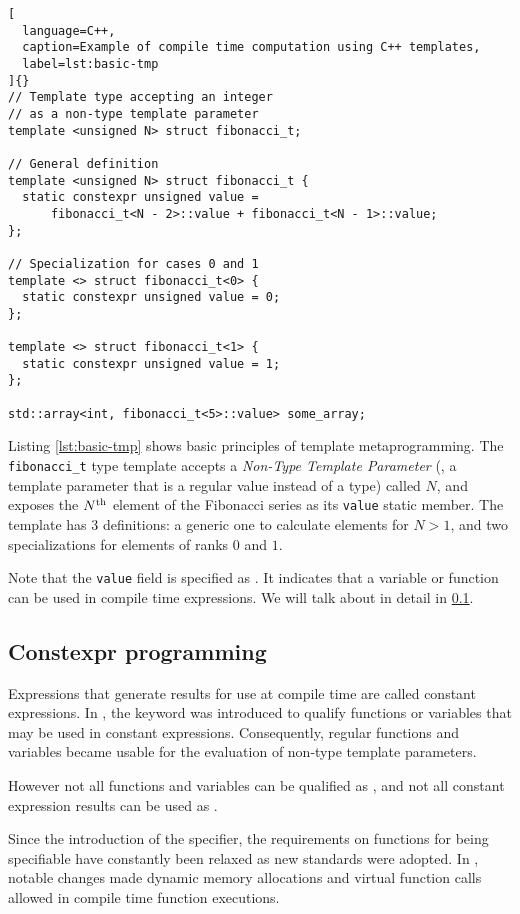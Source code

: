 \documentclass[../main]{subfiles}
\begin{document}
\begin{lstlisting}[
  language=C++,
  caption=Example of compile time computation using C++ templates,
  label=lst:basic-tmp
]{}
// Template type accepting an integer
// as a non-type template parameter
template <unsigned N> struct fibonacci_t;

// General definition
template <unsigned N> struct fibonacci_t {
  static constexpr unsigned value =
      fibonacci_t<N - 2>::value + fibonacci_t<N - 1>::value;
};

// Specialization for cases 0 and 1
template <> struct fibonacci_t<0> {
  static constexpr unsigned value = 0;
};

template <> struct fibonacci_t<1> {
  static constexpr unsigned value = 1;
};

std::array<int, fibonacci_t<5>::value> some_array;
\end{lstlisting}

Listing \ref{lst:basic-tmp} shows basic principles of \cpp template
metaprogramming. The \lstinline{fibonacci_t} type template accepts a
\textit{Non-Type Template Parameter} (\nttp, \ie a template parameter that is
a regular value instead of a type) called $N$, and exposes the
$N\textsuperscript{th}$ element of the Fibonacci series as its
\lstinline{value} static member. The template has 3 definitions:
a generic one to calculate elements for $N > 1$,
and two specializations for elements of ranks $0$ and $1$.

Note that the \lstinline{value} field is specified as \constexpr.
It indicates that a variable or function can be used in compile time
expressions.
We will talk about \constexpr in detail in \ref{lbl:constexpr-programming}.

\subsection{
  Constexpr programming
}
\label{lbl:constexpr-programming}

Expressions that generate results for use at compile time are called
constant expressions. In , the \constexpr keyword was introduced
to qualify functions or variables that may be used in constant expressions.
Consequently, regular functions and variables became usable for the evaluation
of non-type template parameters.

However not all functions and variables can be qualified as \constexpr,
and not all constant expression results can be used as \nttps.

Since the introduction of the \constexpr specifier, the requirements on
functions for being \constexpr specifiable have constantly been relaxed as new
\cpp standards were adopted. In , notable changes made dynamic memory
allocations\cite{constexpr-memory} and virtual \constexpr function
calls\cite{virtual-constexpr} allowed in compile time \constexpr function
executions.
\end{document}
